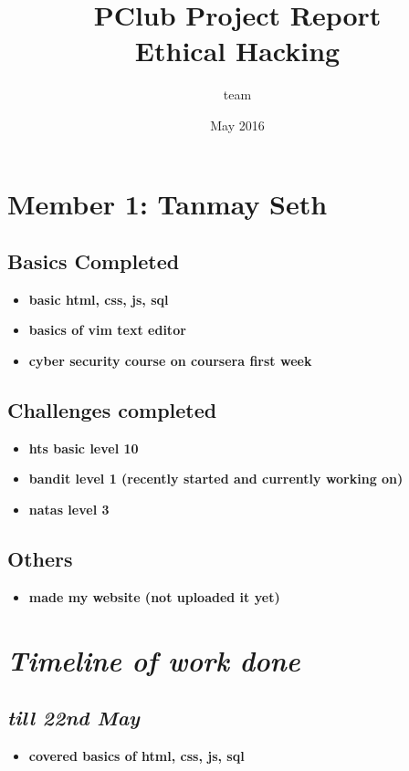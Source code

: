 \documentclass{article}
\title{
PClub Project Report
\\
Ethical Hacking
}
\author{team}
\date{May 2016}
\begin{document}
\maketitle

\newpage 

\tableofcontents

\newpage
\section*{Member 1: Tanmay Seth}
\subsection*{Basics Completed}
\begin{itemize}
    \item \textbf{ basic html, css, js, sql}
    \item \textbf{basics of vim text editor}
    \item \textbf{cyber security course on coursera first week}
\end{itemize}
\subsection*{Challenges completed}
\begin{itemize}
    \item \textbf{hts basic level 10}
    \item \textbf{bandit level 1 (recently started and currently working on)}
    \item \textbf{natas level 3}
\end{itemize}
\subsection*{Others}
\begin{itemize}
    \item \textbf{made my website (not uploaded it yet)}
\end{itemize}
\section*{\textit{Timeline of work done}}
\subsection*{\textit{till 22nd May}}
\begin{itemize}
    \item \textbf{covered basics of html, css, js, sql}
\end{itemize}
\end{document}

